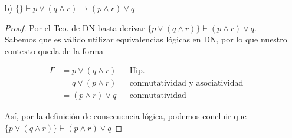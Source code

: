 \documentclass[letterpaper,10pt]{article}
\begin{document}
\begin{enumerate}
\begin{itemize}
\begin{proof}
                \begin{align*}
                    \Gamma &= p \rightarrow (q \lor r)
                    && \text{Hip.} \\
                    &= \neg p \lor (q \lor r)
                    && \text{equiv. logica} \\
                    &=  (\neg p \lor \neg p) \lor (q \lor r)
                    && \text{idempotencia} \\
                    &= (\neg p \lor q) \lor (\neg p \lor r)
                    && \text{conmutatividad y asociatividad} \\
                    &= (p \rightarrow q) \lor (p \rightarrow r)
                    && \text{equiv. lógica}
                \end{align*}

                Así, por la definición de consecuencia lógica, podemos 
                concluir que 
                $\{ p \rightarrow (q \lor r) \} \vdash
                (p \rightarrow q) \lor (p \rightarrow r)$.

            \end{proof}

            \item[b)] $\{ \} \vdash p \lor (q \land r) 
            \rightarrow (p \land r) \lor q$
            \begin{proof}
                Por el Teo. de DN basta derivar
                $\{p\lor (q \land r) \} \vdash (p \land r) \lor q$. Sabemos que
                es válido utilizar equivalencias lógicas en DN, por lo que 
                nuestro contexto queda de la forma 

                \begin{align*}
                    \Gamma &= p \lor (q \land r) 
                    && \text{Hip.} \\
                    &= q \lor (p \land r) 
                    && \text{conmutatividad y asociatividad} \\
                    &= (p \land r) \lor q
                    && \text{conmutatividad}
                \end{align*}

                Así, por la definición de consecuencia lógica, podemos
                concluir que 
                $\{p\lor (q \land r) \} \vdash (p \land r) \lor q$
            \end{proof}
        \end{itemize}


\end{enumerate}
\end{document}
